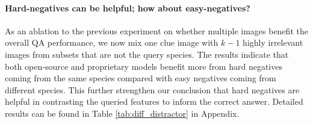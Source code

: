 \paragraph{Hard-negatives can be helpful; how about easy-negatives?}
As an ablation to the previous experiment on whether multiple images benefit the overall QA performance, we now mix one clue image with $k-1$ highly irrelevant images from subsets that are not the query species. The results indicate that both open-source and proprietary models benefit more from hard negatives coming from the same species compared with easy negatives coming from different species. This further strengthen our conclusion that hard negatives are helpful in contrasting the queried features to inform the correct answer.
Detailed results can be found in Table \ref{tab:diff_distractor} in Appendix.





